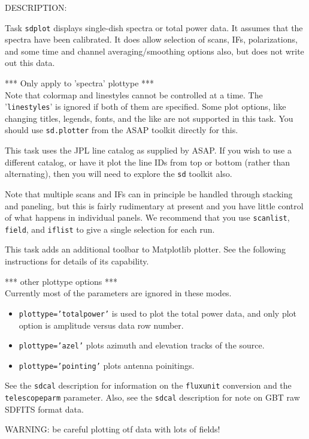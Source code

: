 DESCRIPTION:
    
Task {\tt sdplot} displays single-dish spectra or total power data.
It assumes that the spectra have been calibrated.
It does allow selection of scans, IFs, polarizations, and
some time and channel averaging/smoothing options also,
but does not write out this data.

*** Only apply to 'spectra' plottype ***\\
Note that colormap and linestyles cannot be controlled at a time.
The '{\tt linestyles}' is ignored if both of them are specified.
Some plot options, like changing titles, legends, fonts,
and the like are not supported in this task.  You should use
{\tt sd.plotter} from the ASAP toolkit directly for this.

This task uses the JPL line catalog as supplied by ASAP.
If you wish to use a different catalog, or have it plot
the line IDs from top or bottom (rather than alternating),
then you will need to explore the {\tt sd} toolkit also.

Note that multiple scans and IFs can in principle be handled
through stacking and paneling, but this is fairly rudimentary
at present and you have little control of what happens in
individual panels.  We recommend that you use {\tt scanlist}, {\tt field},
and {\tt iflist} to give a single selection for each run.

This task adds an additional toolbar to Matplotlib plotter. See the following 
instructions for details of its capability.

*** other plottype options ***\\
Currently most of the parameters are ignored in these modes.

\begin{itemize}
\item {\tt plottype='totalpower'} is used to plot the total power data, and only plot option is amplitude versus data row number.
\item {\tt plottype='azel'} plots azimuth and elevation tracks of the source.
\item {\tt plottype='pointing'} plots antenna poinitings.
\end{itemize}

See the {\tt sdcal} description for information on the {\tt fluxunit} conversion
and the {\tt telescopeparm} parameter.
Also, see the {\tt sdcal} description for note on GBT raw SDFITS format data.

WARNING: be careful plotting otf data with lots of fields!

